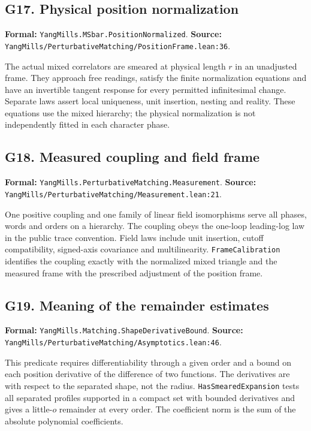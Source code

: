 \documentclass[11pt]{article}
\newcommand{\code}[1]{{\small\nolinkurl{#1}}}
\begin{document}
\subsection*{G17. Physical position normalization}
\label{gloss:G17}
\textbf{Formal:} \code{YangMills.MSbar.PositionNormalized}.\newline
\textbf{Source:} \code{YangMills/PerturbativeMatching/PositionFrame.lean:36}.

The actual mixed correlators are smeared at physical length $r$
in an unadjusted frame. They approach free readings, satisfy the
finite normalization equations and have an invertible tangent
response for every permitted infinitesimal change. Separate laws
assert local uniqueness, unit insertion, nesting and reality.
These equations use the mixed hierarchy; the physical normalization
is not independently fitted in each character phase.

\subsection*{G18. Measured coupling and field frame}
\label{gloss:G18}
\textbf{Formal:} \code{YangMills.PerturbativeMatching.Measurement}.\newline
\textbf{Source:} \code{YangMills/PerturbativeMatching/Measurement.lean:21}.

One positive coupling and one family of linear field isomorphisms
serve all phases, words and orders on a hierarchy. The coupling
obeys the one-loop leading-log law in the public trace convention.
Field laws include unit insertion, cutoff compatibility, signed-axis
covariance and multilinearity. \code{FrameCalibration} identifies the
coupling exactly with the normalized mixed triangle and the measured
frame with the prescribed adjustment of the position frame.

\subsection*{G19. Meaning of the remainder estimates}
\label{gloss:G19}
\textbf{Formal:} \code{YangMills.Matching.ShapeDerivativeBound}.\newline
\textbf{Source:} \code{YangMills/PerturbativeMatching/Asymptotics.lean:46}.

This predicate requires differentiability through a given order
and a bound on each position derivative of the difference of two
functions. The derivatives are with respect to the separated shape,
not the radius. \code{HasSmearedExpansion} tests all separated
profiles supported in a compact set with bounded derivatives and
gives a little-$o$ remainder at every order. The coefficient norm
is the sum of the absolute polynomial coefficients.
\end{document}
